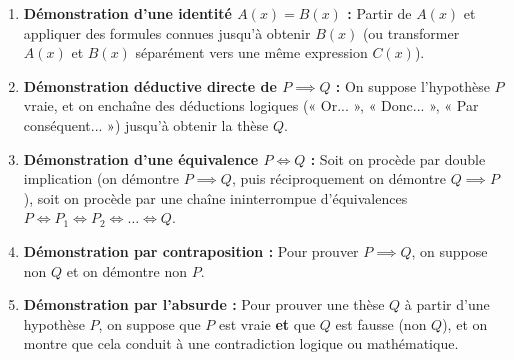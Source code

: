 \begin{theoreme}
\begin{enumerate}
    \item \textbf{Démonstration d'une identité $A(x) = B(x)$ :} Partir de $A(x)$ et appliquer des formules connues jusqu'à obtenir $B(x)$ (ou transformer $A(x)$ et $B(x)$ séparément vers une même expression $C(x)$).
    \item \textbf{Démonstration déductive directe de $P \implies Q$ :} On suppose l'hypothèse $P$ vraie, et on enchaîne des déductions logiques (« Or... », « Donc... », « Par conséquent... ») jusqu'à obtenir la thèse $Q$.
    \item \textbf{Démonstration d'une équivalence $P \iff Q$ :} Soit on procède par double implication (on démontre $P \implies Q$, puis réciproquement on démontre $Q \implies P$), soit on procède par une chaîne ininterrompue d'équivalences $P \iff P_1 \iff P_2 \iff \dots \iff Q$.
    \item \textbf{Démonstration par contraposition :} Pour prouver $P \implies Q$, on suppose $\text{non } Q$ et on démontre $\text{non } P$.
    \item \textbf{Démonstration par l'absurde :} Pour prouver une thèse $Q$ à partir d'une hypothèse $P$, on suppose que $P$ est vraie \textbf{et} que $Q$ est fausse ($\text{non } Q$), et on montre que cela conduit à une contradiction logique ou mathématique.
\end{enumerate}
\end{theoreme}
